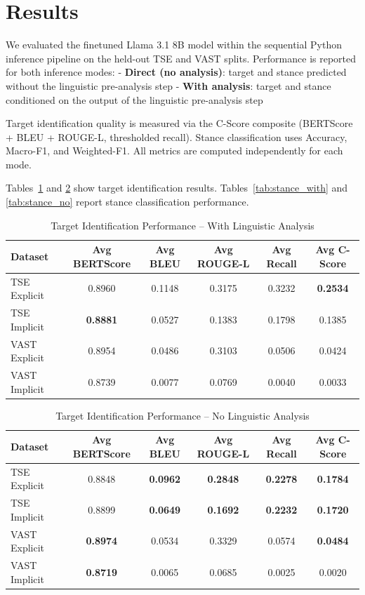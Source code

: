 \documentclass[conference]{IEEEtran}
\begin{document}
\section{Results}

We evaluated the finetuned Llama 3.1 8B model within the sequential Python inference pipeline on the held-out TSE and VAST splits. Performance is reported for both inference modes:  
- \textbf{Direct (no analysis)}: target and stance predicted without the linguistic pre-analysis step  
- \textbf{With analysis}: target and stance conditioned on the output of the linguistic pre-analysis step  

Target identification quality is measured via the C-Score composite (BERTScore + BLEU + ROUGE-L, thresholded recall). Stance classification uses Accuracy, Macro-F1, and Weighted-F1. All metrics are computed independently for each mode.

Tables~\ref{tab:target_with} and \ref{tab:target_no} show target identification results. Tables~\ref{tab:stance_with} and \ref{tab:stance_no} report stance classification performance.

\begin{table}[htbp]
\centering
\caption{Target Identification Performance -- With Linguistic Analysis}
\label{tab:target_with}
\small
\begin{tabular}{|l|c|c|c|c|c|}
\hline
\textbf{Dataset} & \textbf{Avg BERTScore} & \textbf{Avg BLEU} & \textbf{Avg ROUGE-L} & \textbf{Avg Recall} & \textbf{Avg C-Score} \\
\hline
TSE Explicit     & 0.8960 & 0.1148 & 0.3175 & 0.3232 & \textbf{0.2534} \\
TSE Implicit     & \textbf{0.8881} & 0.0527 & 0.1383 & 0.1798 & 0.1385 \\
VAST Explicit    & 0.8954 & 0.0486 & 0.3103 & 0.0506 & 0.0424 \\
VAST Implicit    & 0.8739 & 0.0077 & 0.0769 & 0.0040 & 0.0033 \\
\hline
\end{tabular}
\end{table}

\begin{table}[htbp]
\centering
\caption{Target Identification Performance -- No Linguistic Analysis}
\label{tab:target_no}
\small
\begin{tabular}{|l|c|c|c|c|c|}
\hline
\textbf{Dataset} & \textbf{Avg BERTScore} & \textbf{Avg BLEU} & \textbf{Avg ROUGE-L} & \textbf{Avg Recall} & \textbf{Avg C-Score} \\
\hline
TSE Explicit     & 0.8848 & \textbf{0.0962} & \textbf{0.2848} & \textbf{0.2278} & \textbf{0.1784} \\
TSE Implicit     & 0.8899 & \textbf{0.0649} & \textbf{0.1692} & \textbf{0.2232} & \textbf{0.1720} \\
VAST Explicit    & \textbf{0.8974} & 0.0534 & 0.3329 & 0.0574 & \textbf{0.0484} \\
VAST Implicit    & \textbf{0.8719} & 0.0065 & 0.0685 & 0.0025 & 0.0020 \\
\hline
\end{tabular}
\end{table}
\end{document}
